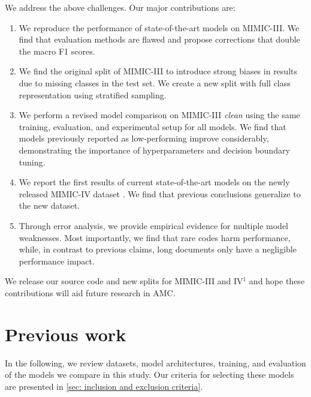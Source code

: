 {We address the above challenges. Our major contributions are:
\begin{enumerate}
    \item We reproduce the performance of state-of-the-art models on MIMIC-III. We find that evaluation methods are flawed and propose corrections that double the macro F1 scores.
    \item We find the original split of MIMIC-III to introduce strong biases in results due to missing classes in the test set. We create a new split with full class representation using stratified sampling.
    \item We perform a revised model comparison on MIMIC-III \textit{clean} using the same training, evaluation, and experimental setup for all models. We find that models previously reported as low-performing improve considerably, demonstrating the importance of hyperparameters and decision boundary tuning.
    \item We report the first results of current state-of-the-art models on the newly released MIMIC-IV dataset \cite{johnsonMIMICIVFreelyAccessible2023, goldbergerPhysioBankPhysioToolkitPhysioNet2000}. We find that previous conclusions generalize to the new dataset.
    \item Through error analysis, we provide empirical evidence for multiple model weaknesses. Most importantly, we find that rare codes harm performance, while, in contrast to previous claims, long documents only have a negligible performance impact.
\end{enumerate}
We release our source code and new splits for MIMIC-III and IV$^\text{1}$
and hope these contributions will aid future research in AMC.


\section{Previous work}

In the following, we review datasets, model architectures, training, and evaluation of the models we compare in this study. Our criteria for selecting these models are presented in \cref{sec: inclusion and exclusion criteria}.

}

